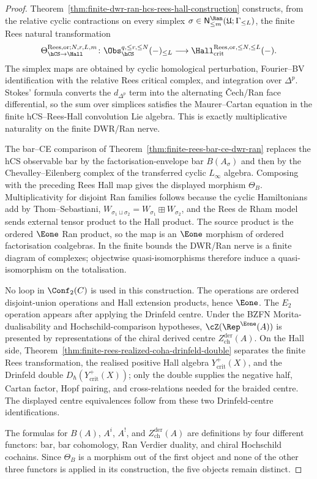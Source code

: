 \begin{proof}
Theorem~\ref{thm:finite-dwr-ran-hcs-rees-hall-construction} constructs,
from the relative cyclic contractions on every simplex
$\sigma\in\mathsf N^{\Ran}_{\le m}(\mathfrak U;\Gamma_{\le L})$, the
finite Rees natural transformation
\[
 \Theta_{\hCS\to\Hall}^{\mathrm{Rees},\mathrm{or};N,r,L,m}\colon
 \Obs_{\hCS}^{q,\le r,\le N}(-)_{\le L}
 \longrightarrow
 \Hall_{\mathrm{crit}}^{\mathrm{Rees},\mathrm{or},\le N,\le L}(-).
\]
The simplex maps are obtained by cyclic homological perturbation,
Fourier--BV identification with the relative Rees critical complex, and
integration over $\Delta^p$. Stokes' formula converts the
$d_{\Delta^p}$ term into the alternating \v{C}ech/Ran face
differential, so the sum over simplices satisfies the Maurer--Cartan
equation in the finite hCS--Rees-Hall convolution Lie algebra. This is
exactly multiplicative naturality on the finite DWR/Ran nerve.

The bar--CE comparison of
Theorem~\ref{thm:finite-rees-bar-ce-dwr-ran} replaces the hCS
observable bar by the factorisation-envelope bar
$B(A_\sigma)$ and then by the Chevalley--Eilenberg complex of the
transferred cyclic $L_\infty$ algebra. Composing with the preceding
Rees Hall map gives the displayed morphism $\Theta_B$. Multiplicativity
for disjoint Ran families follows because the cyclic Hamiltonians add by
Thom--Sebastiani,
$W_{\sigma_1\sqcup\sigma_2}=W_{\sigma_1}\boxplus W_{\sigma_2}$, and
the Rees de Rham model sends external tensor product to the Hall
product. The source product is the ordered $\Eone$ Ran product, so the
map is an $\Eone$ morphism of ordered factorisation coalgebras. In the
finite bounds the DWR/Ran nerve is a finite diagram of complexes;
objectwise quasi-isomorphisms therefore induce a quasi-isomorphism on
the totalisation.

No loop in $\Conf_2(C)$ is used in this construction. The operations are
ordered disjoint-union operations and Hall extension products, hence
$\Eone$. The $E_2$ operation appears after applying the Drinfeld centre.
Under the BZFN Morita-dualisability and Hochschild-comparison
hypotheses, $\cZ(\Rep^{\Eone}(A))$ is presented by representations of
the chiral derived centre $Z^{\mathrm{der}}_{\mathrm{ch}}(A)$. On the
Hall side,
Theorem~\ref{thm:finite-rees-realized-coha-drinfeld-double} separates
the finite Rees transformation, the realised positive Hall algebra
$Y^+_{\mathrm{crit}}(X)$, and the Drinfeld double
$D_\hbar(Y^+_{\mathrm{crit}}(X))$; only the double supplies the negative
half, Cartan factor, Hopf pairing, and cross-relations needed for the
braided centre. The displayed centre equivalences follow from these two
Drinfeld-centre identifications.

The formulas for $B(A)$, $A^i$, $A^!$, and
$Z^{\mathrm{der}}_{\mathrm{ch}}(A)$ are definitions by four different
functors: bar, bar cohomology, Ran Verdier duality, and chiral
Hochschild cochains. Since $\Theta_B$ is a morphism out of the first
object and none of the other three functors is applied in its
construction, the five objects remain distinct.
\end{proof}


